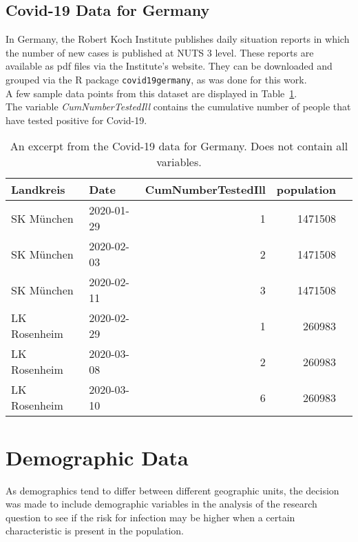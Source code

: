 \subsection{Covid-19 Data for Germany}
In Germany, the Robert Koch Institute publishes daily situation reports in which the number of new cases is published at NUTS 3 level. These reports are available as pdf files via the Institute's website. They can be downloaded and grouped via the R package \texttt{covid19germany}\cite{covid19germany}, as was done for this work.\\
A few sample data points from this dataset are displayed in Table~\ref{datasetGermany}.\\
The variable \textit{CumNumberTestedIll} contains the cumulative number of people that have tested positive for Covid-19.
\begin{table}[H] 
\caption{An excerpt from the Covid-19 data for Germany. Does not contain all variables.\label{datasetGermany}}
\begin{tabular}{l l r r r}
\toprule
\textbf{Landkreis}	& \textbf{Date}	& \textbf{CumNumberTestedIll} & \textbf{population}\\
\midrule
SK München & 2020-01-29 & 1 & 1471508\\
SK München & 2020-02-03 & 2 & 1471508\\
SK München & 2020-02-11 & 3 & 1471508\\
LK Rosenheim & 2020-02-29 & 1 & 260983\\
LK Rosenheim & 2020-03-08 & 2 & 260983 \\
LK Rosenheim & 2020-03-10 & 6 & 260983 \\
\bottomrule
\end{tabular}
\end{table}
\clearpage
\section{Demographic Data}
As demographics tend to differ between different geographic units, the decision was made to include demographic variables in the analysis of the research question to see if the risk for infection may be higher when a certain characteristic is present in the population.

